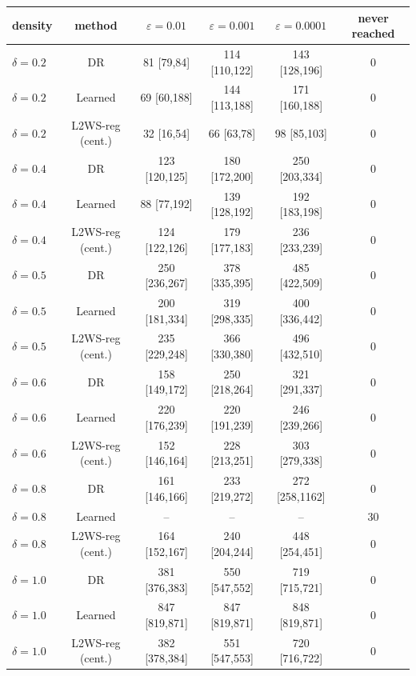 
\begin{tabular}{lccccc}
\toprule
density & method & $\varepsilon=0.01$ & $\varepsilon=0.001$ & $\varepsilon=0.0001$ & never reached \\
\midrule
$\delta=0.2$ & DR & 81 [79,84] & 114 [110,122] & 143 [128,196] & 0 \\
$\delta=0.2$ & Learned & 69 [60,188] & 144 [113,188] & 171 [160,188] & 0 \\
$\delta=0.2$ & L2WS-reg (cent.) & 32 [16,54] & 66 [63,78] & 98 [85,103] & 0 \\
$\delta=0.4$ & DR & 123 [120,125] & 180 [172,200] & 250 [203,334] & 0 \\
$\delta=0.4$ & Learned & 88 [77,192] & 139 [128,192] & 192 [183,198] & 0 \\
$\delta=0.4$ & L2WS-reg (cent.) & 124 [122,126] & 179 [177,183] & 236 [233,239] & 0 \\
$\delta=0.5$ & DR & 250 [236,267] & 378 [335,395] & 485 [422,509] & 0 \\
$\delta=0.5$ & Learned & 200 [181,334] & 319 [298,335] & 400 [336,442] & 0 \\
$\delta=0.5$ & L2WS-reg (cent.) & 235 [229,248] & 366 [330,380] & 496 [432,510] & 0 \\
$\delta=0.6$ & DR & 158 [149,172] & 250 [218,264] & 321 [291,337] & 0 \\
$\delta=0.6$ & Learned & 220 [176,239] & 220 [191,239] & 246 [239,266] & 0 \\
$\delta=0.6$ & L2WS-reg (cent.) & 152 [146,164] & 228 [213,251] & 303 [279,338] & 0 \\
$\delta=0.8$ & DR & 161 [146,166] & 233 [219,272] & 272 [258,1162] & 0 \\
$\delta=0.8$ & Learned & -- & -- & -- & 30 \\
$\delta=0.8$ & L2WS-reg (cent.) & 164 [152,167] & 240 [204,244] & 448 [254,451] & 0 \\
$\delta=1.0$ & DR & 381 [376,383] & 550 [547,552] & 719 [715,721] & 0 \\
$\delta=1.0$ & Learned & 847 [819,871] & 847 [819,871] & 848 [819,871] & 0 \\
$\delta=1.0$ & L2WS-reg (cent.) & 382 [378,384] & 551 [547,553] & 720 [716,722] & 0 \\
\bottomrule
\end{tabular}

